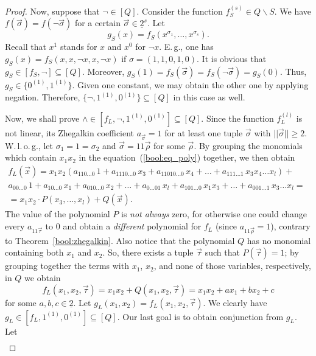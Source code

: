 \documentclass[12pt,notitlepage]{article}
\theoremstyle{plain}
\theoremstyle{definition}
\theoremstyle{plain}
\newcommand{\sbs}{\subseteq}
\renewcommand{\setminus}{\smallsetminus}
\newcommand{\ul}[1]{\underline{#1}}
\newcommand{\1}{\mathbf{1}}
\newcommand{\0}{\mathbf{0}}
\begin{document}
\begin{proof}
	Now, suppose that $\neg \in [Q]$. Consider the function $f^{(s)}_S \in Q \setminus S$. We have $f(\vec{\sigma}) = f(\neg\vec{\sigma})$ for a certain $\vec\sigma \in \ul{2}^s$. Let 
	$$g_S(x) = f_S(x^{\sigma_1},\ldots,x^{\sigma_s}).$$
	Recall that $x^1$ stands for $x$ and $x^0$ for $\neg x$. E.\,g., one has $g_S(x) = f_S(x, x, \neg x, x, \neg x)$ if $\sigma = (1,1,0,1,0)$. It is obvious that $g_S \in [f_S, {\neg}] \sbs [Q]$. Moreover, $g_S(1) = f_S(\vec \sigma) = f_S(\neg\vec \sigma) = g_S(0)$. Thus, $g_S  \in \{0^{(1)}, 1^{(1)}\}$. Given one constant, we may obtain the other one by applying negation. Therefore, $\{{\neg}, 1^{(1)}, 0^{(1)}\} \sbs [Q]$ in this case as well.
	
	Now, we shall prove ${\wedge} \in [f_L, {\neg}, 1^{(1)}, 0^{(1)}] \sbs  [Q]$. Since the function $f^{(l)}_L$ is not linear, its Zhegalkin coefficient $a_{\vec\sigma} = 1$ for at least one tuple $\vec \sigma$ with $||\vec{\sigma}|| \geq 2$. W.\,l.\,o.\,g., let $\sigma_1 = 1 = \sigma_2$ and $\vec{\sigma} = 11\vec{\rho}$ for some $\vec{\rho}$. By grouping the monomials which contain $x_1 x_2$ in the equation~(\ref{bool:eq_poly}) together, we then obtain
	\begin{multline*}
		f_L(\vec x) = x_1 x_2 (a_{110\ldots0}\, 1 + a_{1110\ldots0}\, x_3 + a_{11010\ldots0}\, x_4 + \ldots + a_{111\ldots1}\, x_3 x_4 \ldots x_l) +\phantom{b}\\
		a_{00\ldots0}\, 1 + a_{10\ldots0}\, x_1 + a_{010\ldots0}\, x_2 + \ldots + a_{0\ldots01}\, x_l + a_{101\ldots0}\, x_1 x_3 + \ldots + a_{001\ldots 1}\, x_3\ldots x_l =\phantom{b}\\
		= x_1 x_2 \cdot P(x_3, \ldots, x_l) + Q(\vec x).
	\end{multline*}
	The value of the polynomial $P$ is \emph{not always} zero, for otherwise one could change every $a_{11\vec{\tau}}$ to $0$ and obtain a \emph{different} polynomial for $f_L$ (since $a_{11\vec{\rho}} = 1$), contrary to Theorem~\ref{bool:zhegalkin}. Also notice that the polynomial $Q$ has no monomial containing both $x_1$ and $x_2$. So, there exists a tuple $\vec{\tau}$ such that $P(\vec{\tau}) = 1$; by grouping together the terms with $x_1$, $x_2$, and none of those variables, respectively, in $Q$ we obtain
	$$f_L(x_1,x_2,\vec{\tau}) = x_1 x_2 + Q(x_1, x_2, \vec \tau) = x_1 x_2 + a x_1 + b x_2 + c$$
	for some $a, b, c \in \ul{2}$. Let $g_L(x_1, x_2) = f_L(x_1,x_2,\vec{\tau})$. We clearly have $g_L \in [f_L, 1^{(1)}, 0^{(1)}] \sbs [Q]$. Our last goal is to obtain conjunction from $g_L$. Let
	\begin{multline*}

\end{multline*}
\end{proof}
\end{document}

